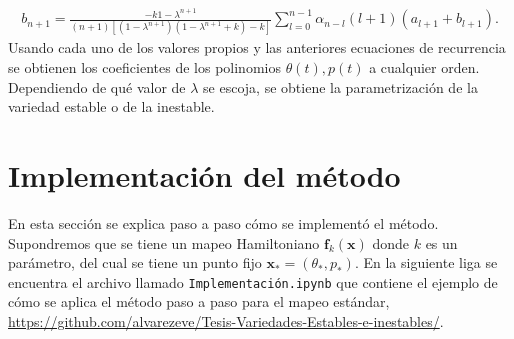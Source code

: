 \begin{eqnarray}
b_{n+1}=\frac{-k 1-\lambda^{n+1}}{(n+1)[(1-\lambda^{n+1})(1-\lambda^{n+1}+k)-k]}\sum_{l=0}^{n-1}\alpha_{n-l}(l+1)(a_{l+1}+b_{l+1}).
\end{eqnarray}
Usando cada uno de los valores propios y las anteriores ecuaciones de recurrencia se obtienen los coeficientes de los polinomios $\theta(t),p(t)$ a cualquier orden. Dependiendo de qué valor de $\lambda$ se escoja, se obtiene la parametrización de la variedad estable o de la inestable.\\





\section{Implementación del método}
En esta sección se explica paso a paso cómo se implementó el método. Su\-pon\-dre\-mos que se tiene un mapeo Hamiltoniano $\mathbf{f}_{k}(\mathbf{x})$ donde $k$  es un parámetro, del cual se tiene un punto fijo $\mathbf{x}_{*}=(\theta_{*},p_{*})$. En la siguiente liga se encuentra el archivo llamado \texttt{Implementación.ipynb} que contiene el ejemplo de cómo se aplica el método paso a paso para el mapeo estándar, \url{https://github.com/alvarezeve/Tesis-Variedades-Estables-e-inestables/}. 
\linebreak


